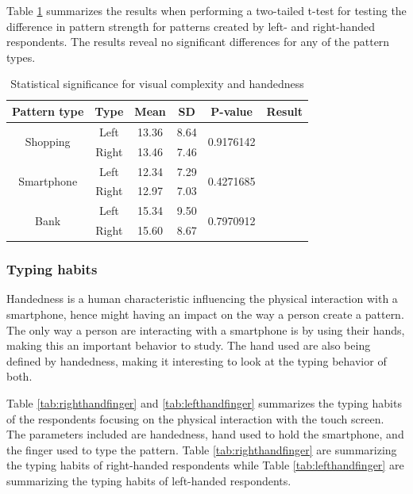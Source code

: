       
      Table \ref{tab:statsigComplexityHandedness} summarizes the results when performing a two-tailed t-test for testing the difference in pattern strength for patterns created by left- and right-handed respondents. The results reveal no significant differences for any of the pattern types. 

      \begin{table}[H]
      \centering
        \begin{tabular}{ c | c | c | c | c | c }
        \hline
          {\bf Pattern type} & {\bf Type} & {\bf Mean} & {\bf SD} & {\bf P-value} & {\bf Result} \\ \hline
          \multirow{2}{*}{Shopping}   & Left  & 13.36 & 8.64 & \multirow{2}{*}{0.9176142} & \multirow{2}{*}{\bf \color{red}{Not significant}} \\
                                      & Right & 13.46 & 7.46 & & \\ \hline
          \multirow{2}{*}{Smartphone} & Left  & 12.34 & 7.29 & \multirow{2}{*}{0.4271685} & \multirow{2}{*}{\bf \color{red}{Not significant}} \\
                                      & Right & 12.97 & 7.03 & & \\ \hline
          \multirow{2}{*}{Bank}       & Left  & 15.34 & 9.50 & \multirow{2}{*}{0.7970912} & \multirow{2}{*}{\bf \color{red}{Not significant}} \\
                                      & Right & 15.60 & 8.67 & & \\ \hline
        \end{tabular}
        \caption{Statistical significance for visual complexity and handedness}
        \label{tab:statsigComplexityHandedness}
      \end{table}

    \clearpage
    \subsubsection{Typing habits}
    Handedness is a human characteristic influencing the physical interaction with a smartphone, hence might having an impact on the way a person create a pattern. The only way a person are interacting with a smartphone is by using their hands, making this an important behavior to study. The hand used are also being defined by handedness, making it interesting to look at the typing behavior of both. 

    Table \ref{tab:righthandfinger} and \ref{tab:lefthandfinger} summarizes the typing habits of the respondents focusing on the physical interaction with the touch screen. The parameters included are handedness, hand used to hold the smartphone, and the finger used to type the pattern. Table \ref{tab:righthandfinger} are summarizing the typing habits of right-handed respondents while Table \ref{tab:lefthandfinger} are summarizing the typing habits of left-handed respondents.

